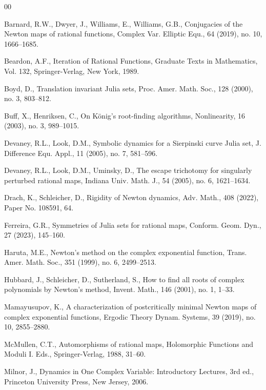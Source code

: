 \documentclass[12pt]{article}
\numberwithin{equation}{section}
\begin{document}
\begin{thebibliography}{00}

   Barnard, R.W., Dwyer, J., Williams, E., Williams, G.B., Conjugacies of the Newton maps of rational functions, Complex Var. Elliptic Equ., 64 (2019), no. 10, 1666--1685.

   Beardon, A.F., Iteration of Rational Functions, Graduate Texts in Mathematics, Vol. 132, Springer-Verlag, New York, 1989.	
	
   Boyd, D., Translation invariant Julia sets, Proc. Amer. Math. Soc., 128 (2000), no. 3, 803--812.

   Buff, X., Henriksen, C., On K\"{o}nig's root-finding algorithms, Nonlinearity, 16 (2003), no. 3, 989--1015.
  
   Devaney, R.L., Look, D.M., Symbolic dynamics for a Sierpinski curve Julia set, J. Difference Equ. Appl., 11 (2005),  no. 7, 581--596.
  
   Devaney, R.L.,  Look, D.M.,  Uminsky, D., The escape trichotomy for singularly perturbed rational maps, Indiana Univ. Math. J., 54 (2005), no. 6, 1621--1634.

   Drach, K., Schleicher, D., Rigidity of Newton dynamics, Adv. Math., 408 (2022), Paper No. 108591, 64.
  
   Ferreira, G.R., Symmetries of Julia sets for rational maps, Conform. Geom. Dyn., 27 (2023), 145--160.
	
   Haruta, M.E., Newton’s method on the complex exponential function, Trans. Amer. Math. Soc., 351 (1999), no. 6, 2499--2513.
	
   Hubbard, J., Schleicher, D., Sutherland, S., How to find all roots of complex polynomials by Newton's method, Invent. Math., 146 (2001), no. 1, 1--33.

   Mamayusupov, K., A characterization of postcritically minimal Newton maps of complex exponential functions, Ergodic Theory Dynam. Systems, 39 (2019), no. 10, 2855--2880.
	
   McMullen, C.T., Automorphisms of rational maps, Holomorphic Functions and Moduli I. Eds., Springer-Verlag, 1988, 31--60.

   Milnor, J., Dynamics in One Complex Variable: Introductory Lectures, 3rd ed., Princeton University Press, New Jersey, 2006.
	

\end{thebibliography}
\end{document}
